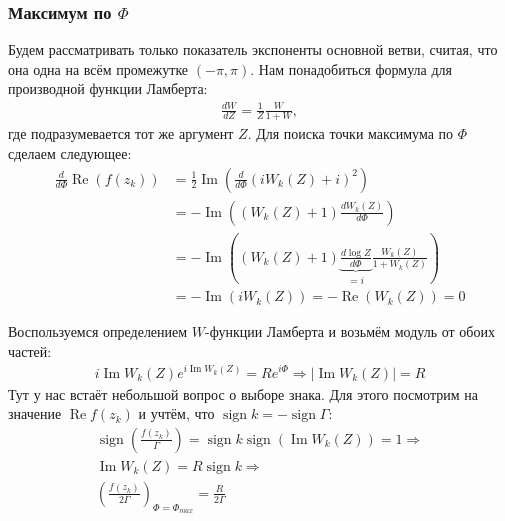 \documentclass[a4paper, 12pt]{article}
\DeclareMathOperator*{\sign}{sign}
\DeclareMathOperator*{\Real}{Re}
\DeclareMathOperator*{\Imag}{Im}
\begin{document}
\subsubsection*{Максимум по $\Phi$}
Будем рассматривать только показатель экспоненты основной ветви, считая, что она одна на всём промежутке $(-\pi, \pi)$.
Нам понадобиться формула для производной функции Ламберта:
\begin{equation}
\begin{aligned}
    \frac{dW}{dZ} = \frac{1}{Z}\frac{W}{1+W},
\end{aligned}
\end{equation}
где подразумевается тот же аргумент $Z$.
Для поиска точки максимума по $\Phi$ сделаем следующее:
\begin{equation}
\begin{aligned}
    \frac{d}{d\Phi}\Real\left(f(z_k)\right) &= 
    \frac{1}{2}\Imag\left(\frac{d}{d\Phi} (iW_k(Z) + i)^2\right) \\
    &= -\Imag\left((W_k(Z) + 1)\frac{dW_k(Z)}{d\Phi}\right)\\
    &= -\Imag\left((W_k(Z) + 1) \underbrace{\frac{d\log Z}{d\Phi}}_{=i} \frac{W_k(Z)}{1+W_k(Z)} \right)\\
    &= -\Imag\left(i W_k(Z)\right) = -\Real(W_k(Z)) = 0
\end{aligned}
\end{equation}

Воспользуемся определением $W$-функции Ламберта и возьмём модуль от обоих частей:
\begin{equation}
\begin{aligned}
    i\Imag W_k(Z)e^{i\Imag W_k(Z)} = R e^{i\Phi} \Rightarrow \left|\Imag W_k(Z)\right| = R
\end{aligned}
\end{equation}
Тут у нас встаёт небольшой вопрос о выборе знака. Для этого посмотрим на значение $\Real f(z_k)$ и учтём, что $\sign k = -\sign \Gamma$:
\begin{equation}
\begin{aligned}
    \sign\left(\frac{f(z_k)}{\Gamma}\right) = \sign k \sign\left(\Imag W_k(Z)\right) = 1 \Rightarrow \\\Imag W_k(Z) = R\sign k \Rightarrow \\
    \left(\frac{f(z_k)}{2\Gamma}\right)_{\Phi = \Phi_{max}} = \frac{R}{2\Gamma}
\end{aligned}
\end{equation}
\end{document}
